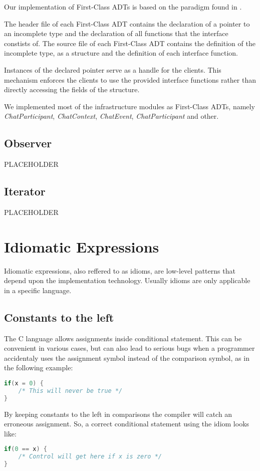 Our implementation of First-Class ADTs is based on the paradigm found in \cite{patternsinc}.

The header file of each First-Class ADT contains the declaration of a pointer to an incomplete type and the declaration of all functions that the interface constists of. The source file of each First-Class ADT contains the definition of the incomplete type, as a structure and the definition of each interface function.

Instances of the declared pointer serve as a handle for the clients. This mechanism enforces the clients to use the provided interface functions rather than directly accessing the fields of the structure.

We implemented most of the infrastructure modules as First-Class ADTs, namely \textit{ChatParticipant}, \textit{ChatContext}, \textit{ChatEvent}, \textit{ChatParticipant} and other.

\subsection{Observer}
PLACEHOLDER

\subsection{Iterator}
PLACEHOLDER

\section{Idiomatic Expressions}
Idiomatic expressions, also reffered to as idioms, are low-level patterns that depend upon the implementation technology. Usually idioms are only applicable in a specific language.

\subsection{Constants to the left}
The C language allows assignments inside conditional statement. This can be convenient in various cases, but can also lead to serious bugs when a programmer accidentaly uses the assignment symbol instead of the comparison symbol, as in the following example:
\begin{lstlisting}[language=C]
if(x = 0) {
    /* This will never be true */
}
\end{lstlisting}

By keeping constants to the left in comparisons the compiler will catch an erroneous assignment. So, a correct conditional statement using the idiom looks like:
\begin{lstlisting}[language=C]
if(0 == x) {
    /* Control will get here if x is zero */
}
\end{lstlisting}


